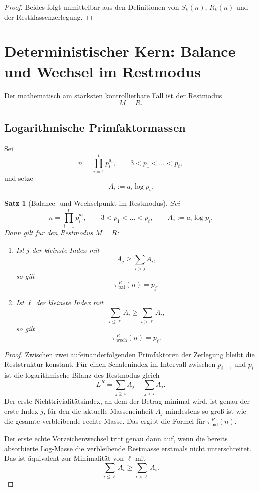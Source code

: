 \documentclass[11pt,a4paper]{article}
\theoremstyle{plain}
\newtheorem{satz}{Satz}[section]
\theoremstyle{definition}
\theoremstyle{remark}
\newcommand{\bal}{\mathrm{bal}}
\newcommand{\wech}{\mathrm{wech}}
\newcommand{\1}{\mathbf{1}}
\begin{document}
	\begin{proof}
		Beides folgt unmittelbar aus den Definitionen von \(S_k(n)\), \(R_k(n)\) und der Restklassenzerlegung.
	\end{proof}
	
	\section{Deterministischer Kern: Balance und Wechsel im Restmodus}
	\label{sec:balance_wechsel}
	
	Der mathematisch am stärksten kontrollierbare Fall ist der Restmodus
	\[
	M=R.
	\]
	
	\subsection{Logarithmische Primfaktormassen}
	
	Sei
	\[
	n=\prod_{i=1}^t p_i^{a_i},
	\qquad
	3<p_1<\dots<p_t,
	\]
	und setze
	\[
	A_i:=a_i\log p_i.
	\]
	
	\begin{satz}[Balance- und Wechselpunkt im Restmodus]
		\label{satz:restmodus_allgemein}
		Sei
		\[
		n=\prod_{i=1}^t p_i^{a_i},
		\qquad
		3<p_1<\dots<p_t,
		\qquad
		A_i:=a_i\log p_i.
		\]
		Dann gilt für den Restmodus \(M=R\):
		\begin{enumerate}[label=(\arabic*)]
			\item Ist \(j\) der kleinste Index mit
			\[
			A_j\ge \sum_{i>j}A_i,
			\]
			so gilt
			\[
			\pi_{\bal}^R(n)=p_j.
			\]
			
			\item Ist \(\ell\) der kleinste Index mit
			\[
			\sum_{i\le \ell}A_i\ge \sum_{i>\ell}A_i,
			\]
			so gilt
			\[
			\pi_{\wech}^R(n)=p_\ell.
			\]
		\end{enumerate}
	\end{satz}
	
	\begin{proof}
		Zwischen zwei aufeinanderfolgenden Primfaktoren der Zerlegung bleibt die Reststruktur konstant. Für einen Schalenindex im Intervall zwischen \(p_{i-1}\) und \(p_i\) ist die logarithmische Bilanz des Restmodus gleich
		\[
		L^R = \sum_{j\ge i}A_j-\sum_{j<i}A_j.
		\]
		Der erste Nichttrivialitätsindex, an dem der Betrag minimal wird, ist genau der erste Index \(j\), für den die aktuelle Masseneinheit \(A_j\) mindestens so groß ist wie die gesamte verbleibende rechte Masse. Das ergibt die Formel für \(\pi_{\bal}^R(n)\).
		
		Der erste echte Vorzeichenwechsel tritt genau dann auf, wenn die bereits absorbierte Log-Masse die verbleibende Restmasse erstmals nicht unterschreitet. Das ist äquivalent zur Minimalität von \(\ell\) mit
		\[
		\sum_{i\le \ell}A_i\ge \sum_{i>\ell}A_i.
		\]
	\end{proof}
	
\end{document}

